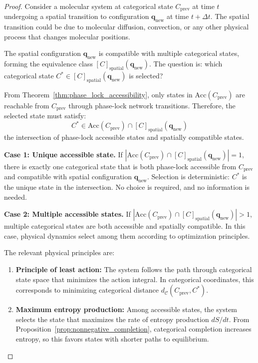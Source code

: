 \documentclass[12pt,a4paper]{article}
\theoremstyle{definition}
\theoremstyle{remark}
\newcommand{\catspace}{\mathcal{C}}
\newcommand{\accessible}{\text{Acc}}
\begin{document}
\begin{proof}
Consider a molecular system at categorical state $C_{\text{prev}}$ at time $t$ undergoing a spatial transition to configuration $\mathbf{q}_{\text{new}}$ at time $t + \Delta t$. The spatial transition could be due to molecular diffusion, convection, or any other physical process that changes molecular positions.

The spatial configuration $\mathbf{q}_{\text{new}}$ is compatible with multiple categorical states, forming the equivalence class $[C]_{\text{spatial}}(\mathbf{q}_{\text{new}})$. The question is: which categorical state $C^* \in [C]_{\text{spatial}}(\mathbf{q}_{\text{new}})$ is selected?

From Theorem~\ref{thm:phase_lock_accessibility}, only states in $\accessible(C_{\text{prev}})$ are reachable from $C_{\text{prev}}$ through phase-lock network transitions. Therefore, the selected state must satisfy:
\begin{equation}
C^* \in \accessible(C_{\text{prev}}) \cap [C]_{\text{spatial}}(\mathbf{q}_{\text{new}})
\end{equation}
the intersection of phase-lock accessible states and spatially compatible states.

\textbf{Case 1: Unique accessible state.}
If $|\accessible(C_{\text{prev}}) \cap [C]_{\text{spatial}}(\mathbf{q}_{\text{new}})| = 1$, there is exactly one categorical state that is both phase-lock accessible from $C_{\text{prev}}$ and compatible with spatial configuration $\mathbf{q}_{\text{new}}$. Selection is deterministic: $C^* $ is the unique state in the intersection. No choice is required, and no information is needed.

\textbf{Case 2: Multiple accessible states.}
If $|\accessible(C_{\text{prev}}) \cap [C]_{\text{spatial}}(\mathbf{q}_{\text{new}})| > 1$, multiple categorical states are both accessible and spatially compatible. In this case, physical dynamics select among them according to optimization principles.

The relevant physical principles are:
\begin{enumerate}
    \item \textbf{Principle of least action:} The system follows the path through categorical state space that minimizes the action integral. In categorical coordinates, this corresponds to minimizing categorical distance $d_{\catspace}(C_{\text{prev}}, C^*)$.

    \item \textbf{Maximum entropy production:} Among accessible states, the system selects the state that maximizes the rate of entropy production $d S/dt$. From Proposition~\ref{prop:nonnegative_completion}, categorical completion increases entropy, so this favors states with shorter paths to equilibrium.


\end{enumerate}
\end{proof}
\end{document}
